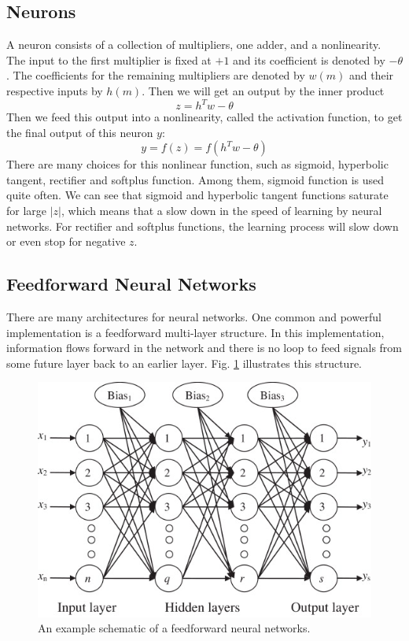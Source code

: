 \documentclass[journal,a4paper,onecolumn,11pt]{IEEEtran}
\begin{document}
\subsection{Neurons}
A neuron consists of a collection of multipliers, one adder, and a nonlinearity. The input to the first multiplier is fixed at $+1$ and its coefficient is denoted by $−\theta$. The coefficients for the remaining multipliers are denoted by $w(m)$ and their respective inputs by $h(m)$. Then we will get an output by the inner product
\begin{equation}
z = h^T w - \theta
\end{equation}
Then we feed this output into a nonlinearity, called the activation function, to get the final output of this neuron $y$:
\begin{equation}
y = f(z) = f(h^T w - \theta)
\end{equation}
There are many choices for this nonlinear function, such as sigmoid, hyperbolic tangent, rectifier and softplus function. Among them, sigmoid function is used quite often. We can see that sigmoid and hyperbolic tangent functions saturate for large $|z|$, which means that a slow down in the speed of learning by neural networks. For rectifier and softplus functions, the learning process will slow down or even stop for negative $z$.

\subsection{Feedforward Neural Networks}
There are many architectures for neural networks. One common and powerful implementation is a feedforward multi-layer structure. In this implementation, information flows forward in the network and there is no loop to feed signals from some future layer back to an earlier layer. Fig. \ref{fig:feadforwardNN} illustrates this structure. 

\begin{figure}[!t] 
	\centering
	\includegraphics[scale=0.8]{feedforwardNN.jpg}
	\caption{An example schematic of a feedforward neural networks.}
	\label{fig:feadforwardNN}
\end{figure}
\end{document}
